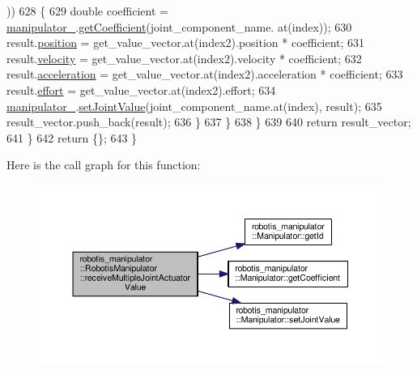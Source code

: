 \begin{DoxyCode}
      ))
628         \{
629           \textcolor{keywordtype}{double} coefficient = \hyperlink{classrobotis__manipulator_1_1_robotis_manipulator_a5b2df4a3b3ee7f408cb1d0eaf61644dc}{manipulator\_}.\hyperlink{classrobotis__manipulator_1_1_manipulator_a437ac5f137aa788c4db07690c185e9ba}{getCoefficient}(joint\_component\_name.
      at(index));
630           result.\hyperlink{structrobotis__manipulator_1_1_point_a0f122386b502d9b316bdead542ed2145}{position} = get\_value\_vector.at(index2).position * coefficient;
631           result.\hyperlink{structrobotis__manipulator_1_1_point_a4eaec95fac0c755eb0aa704b36ebe97b}{velocity} = get\_value\_vector.at(index2).velocity * coefficient;
632           result.\hyperlink{structrobotis__manipulator_1_1_point_adb49f1fbcc0eaa7f530c54fdf0ede836}{acceleration} = get\_value\_vector.at(index2).acceleration * coefficient;
633           result.\hyperlink{structrobotis__manipulator_1_1_point_add1a7019fc87cc2ac9bdf033372a9bb6}{effort} = get\_value\_vector.at(index2).effort;
634           \hyperlink{classrobotis__manipulator_1_1_robotis_manipulator_a5b2df4a3b3ee7f408cb1d0eaf61644dc}{manipulator\_}.\hyperlink{classrobotis__manipulator_1_1_manipulator_aa740b17551040520851ec8dc1d619bfe}{setJointValue}(joint\_component\_name.at(index), result);
635           result\_vector.push\_back(result);
636         \}
637       \}
638     \}
639 
640     \textcolor{keywordflow}{return} result\_vector;
641   \}
642   \textcolor{keywordflow}{return} \{\};
643 \}
\end{DoxyCode}


Here is the call graph for this function\+:\nopagebreak
\begin{figure}[H]
\begin{center}
\leavevmode
\includegraphics[width=350pt]{classrobotis__manipulator_1_1_robotis_manipulator_a6affcbccc199ff5fadcf6b827d368c91_cgraph}
\end{center}
\end{figure}


